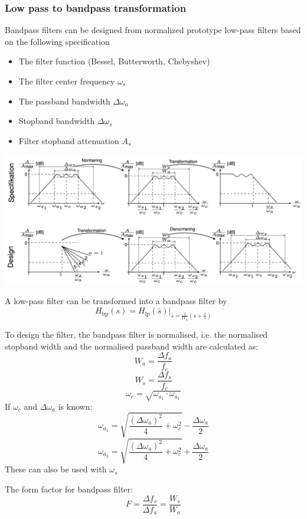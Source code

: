 \subsubsection{Low pass to bandpass transformation}
Bandpass filters can be designed from normalized prototype low-pass filters based on the following specification
\begin{itemize}
  \item The filter function (Bessel, Butterworth, Chebyshev) 
  \item The filter center frequency $\omega_{s}$
  \item The passband bandwidth $\Delta \omega _a$
  \item Stopband bandwidth $\Delta \omega _s$
  \item Filter stopband attenuation $A_{s}$
\end{itemize}

\begin{center}
  \includegraphics[width=\textwidth]{Images/LP-to-BP.png} 
\end{center}
A low-pass filter can be transformed into a bandpass filter by
$$H_{\text{bp}}(s)=H_{\text{lp}}(\bar{s})|_{\bar{s}=\frac{1}{W_{a}}\left( s+\frac{1}{s} \right)}$$

To design the filter, the bandpass filter is normalised, i.e. the normalised stopband width and the normalised passband width are calculated as:
$$W_{a}=\frac{\Delta f_{a}}{f_{c}}$$
$$W_{s}=\frac{\Delta f_{s}}{f_{c}}$$
$$\omega_c=\sqrt{\omega_{a_1}\cdot\omega_{a_1}}$$
If $\omega_c$ and $\Delta\omega_a$ is known:
$$\omega_{a_1}=\sqrt{\frac{(\Delta \omega_a)^2}{4}+\omega_c^2}-\frac{\Delta\omega_a}{2}$$
$$\omega_{a_2}=\sqrt{\frac{(\Delta \omega_a)^2}{4}+\omega_c^2}+\frac{\Delta\omega_a}{2}$$
These can also be used with $\omega_s$

The form factor for bandpass filter:
$$F=\frac{\Delta f_{s}}{\Delta f_{a}}=\frac{W_{s}}{W_{a}}$$


